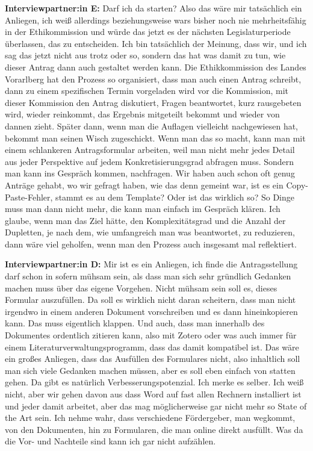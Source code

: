 \documentclass[a4paper,12pt,twoside]{scrreprt}
\begin{document}
\textbf{Interviewpartner:in E:} Darf ich da starten? Also das wäre mir tatsächlich ein Anliegen, ich weiß allerdings beziehungsweise wars bisher noch nie mehrheitsfähig in der Ethikommission und würde das jetzt es der nächsten Legislaturperiode überlassen, das zu entscheiden. Ich bin tatsächlich der Meinung, dass wir, und ich sag das jetzt nicht aus trotz oder so, sondern das hat was damit zu tun, wie dieser Antrag dann auch gestaltet werden kann. Die Ethikkommission des Landes Vorarlberg hat den Prozess so organisiert, dass man auch einen Antrag schreibt, dann zu einem spezifischen Termin vorgeladen wird vor die Kommission, mit dieser Kommission den Antrag diskutiert, Fragen beantwortet, kurz rausgebeten wird, wieder reinkommt, das Ergebnis mitgeteilt bekommt und wieder von dannen zieht. Später dann, wenn man die Auflagen vielleicht nachgewiesen hat, bekommt man seinen Wisch zugeschickt. Wenn man das so macht, kann man mit einem schlankeren Antragsformular arbeiten, weil man nicht mehr jedes Detail aus jeder Perspektive auf jedem Konkretisierungsgrad abfragen muss. Sondern man kann ins Gespräch kommen, nachfragen. Wir haben auch schon oft genug Anträge gehabt, wo wir gefragt haben, wie das denn gemeint war, ist es ein Copy-Paste-Fehler, stammt es au dem Template? Oder ist das wirklich so? So Dinge muss man dann nicht mehr, die kann man einfach im Gespräch klären. Ich glaube, wenn man das Ziel hätte, den Komplexitätsgrad und die Anzahl der Dupletten, je nach dem, wie umfangreich man was beantwortet, zu reduzieren, dann wäre viel geholfen, wenn man den Prozess auch insgesamt mal reflektiert.

\textbf{Interviewpartner:in D:} Mir ist es ein Anliegen, ich finde die Antragsstellung darf schon in sofern mühsam sein, als dass man sich sehr gründlich Gedanken machen muss über das eigene Vorgehen. Nicht mühsam sein soll es, dieses Formular auszufüllen. Da soll es wirklich nicht daran scheitern, dass man nicht irgendwo in einem anderen Dokument vorschreiben und es dann hineinkopieren kann. Das muss eigentlich klappen. Und auch, dass man innerhalb des Dokumentes ordentlich zitieren kann, also mit Zotero oder  was auch immer für einem Literaturverwaltungsprogramm, dass das damit kompatibel ist. Das wäre ein großes Anliegen, dass das Ausfüllen des Formulares nicht, also inhaltlich soll man sich viele Gedanken machen müssen, aber es soll eben einfach von statten gehen. Da gibt es natürlich Verbesserungspotenzial. Ich merke es selber. Ich weiß nicht, aber wir gehen davon aus dass Word auf fast allen Rechnern installiert ist und jeder damit arbeitet, aber das mag möglicherweise gar nicht mehr so State of the Art sein. Ich nehme wahr, dass verschiedene Fördergeber, man wegkommt, von den Dokumenten, hin zu Formularen, die man online direkt ausfüllt. Was da die Vor- und Nachteile sind kann ich gar nicht aufzählen.
\end{document}
